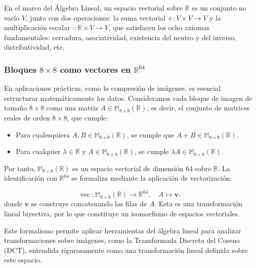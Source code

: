 \documentclass[8pt,a4paper]{article}
\theoremstyle{definition}
\theoremstyle{remark}
\begin{document}
\begin{multicols}{2}
            En el marco del Álgebra Lineal, un espacio vectorial sobre \( \mathbb{R} \) es un conjunto no vacío \( V \), junto con dos operaciones: la suma vectorial \( + : V \times V \to V \) y la multiplicación escalar \( \cdot : \mathbb{R} \times V \to V \), que satisfacen los ocho axiomas fundamentales: cerradura, asociatividad, existencia del neutro y del inverso, distributividad, etc.

            \subsubsection{\texorpdfstring{Bloques \(8 \times 8\) como vectores en \(\mathbb{R}^{64}\)}{Bloques 8 × 8 como vectores en R⁶⁴}}  
            En aplicaciones prácticas, como la compresión de imágenes, es esencial estructurar matemáticamente los datos. Consideramos cada bloque de imagen de tamaño \( 8 \times 8 \) como una matriz \( A \in \mathbb{M}_{8 \times 8}(\mathbb{R}) \), es decir, el conjunto de matrices reales de orden \( 8 \times 8 \), que cumple:  
            
            \begin{itemize}
                \item Para cualesquiera \( A, B \in \mathbb{M}_{8 \times 8}(\mathbb{R}) \), se cumple que \( A + B \in \mathbb{M}_{8 \times 8}(\mathbb{R}) \).
                \item Para cualquier \( \lambda \in \mathbb{R} \) y \( A \in \mathbb{M}_{8 \times 8}(\mathbb{R}) \), se cumple \( \lambda A \in \mathbb{M}_{8 \times 8}(\mathbb{R}) \).
            \end{itemize}
            
            Por tanto, \( \mathbb{M}_{8 \times 8}(\mathbb{R}) \) es un espacio vectorial de dimensión \( 64 \) sobre \( \mathbb{R} \). La identificación con \( \mathbb{R}^{64} \) se formaliza mediante la aplicación de vectorización:
            
            \[
            \operatorname{vec}: \mathbb{M}_{8 \times 8}(\mathbb{R}) \longrightarrow \mathbb{R}^{64}, \quad A \mapsto \mathbf{v},
            \]
            donde \( \mathbf{v} \) se construye concatenando las filas de \( A \). Esta es una transformación lineal biyectiva, por lo que constituye un isomorfismo de espacios vectoriales.
            
            Este formalismo permite aplicar herramientas del álgebra lineal para analizar transformaciones sobre imágenes, como la Transformada Discreta del Coseno (DCT), entendida rigurosamente como una transformación lineal definida sobre este espacio.


\end{multicols}
\end{document}
